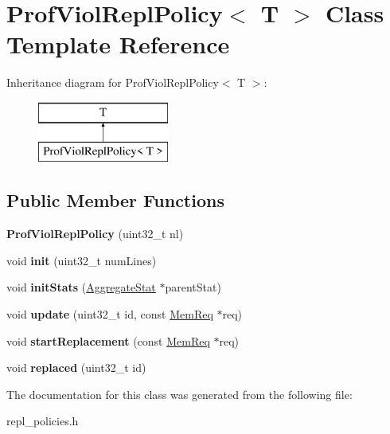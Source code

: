 \hypertarget{classProfViolReplPolicy}{\section{Prof\-Viol\-Repl\-Policy$<$ T $>$ Class Template Reference}
\label{classProfViolReplPolicy}
}
Inheritance diagram for Prof\-Viol\-Repl\-Policy$<$ T $>$\-:\begin{figure}[H]
\begin{center}
\leavevmode
\includegraphics[height=2.000000cm]{classProfViolReplPolicy}
\end{center}
\end{figure}
\subsection*{Public Member Functions}
\begin{DoxyCompactItemize}
\item 
\hypertarget{classProfViolReplPolicy_a2d18c0ce23ac41aec6f6072b346f633c}{{\bfseries Prof\-Viol\-Repl\-Policy} (uint32\-\_\-t nl)}\label{classProfViolReplPolicy_a2d18c0ce23ac41aec6f6072b346f633c}

\item 
\hypertarget{classProfViolReplPolicy_a2ab282d60729a80a3f385e47be4c256b}{void {\bfseries init} (uint32\-\_\-t num\-Lines)}\label{classProfViolReplPolicy_a2ab282d60729a80a3f385e47be4c256b}

\item 
\hypertarget{classProfViolReplPolicy_a386dca240e3305a99b077f9dc6949f04}{void {\bfseries init\-Stats} (\hyperlink{classAggregateStat}{Aggregate\-Stat} $\ast$parent\-Stat)}\label{classProfViolReplPolicy_a386dca240e3305a99b077f9dc6949f04}

\item 
\hypertarget{classProfViolReplPolicy_ab463dd1014ffe813a31216e3a55ba2a9}{void {\bfseries update} (uint32\-\_\-t id, const \hyperlink{structMemReq}{Mem\-Req} $\ast$req)}\label{classProfViolReplPolicy_ab463dd1014ffe813a31216e3a55ba2a9}

\item 
\hypertarget{classProfViolReplPolicy_a7c2e6d39c29c16e37571addbf39e3aaa}{void {\bfseries start\-Replacement} (const \hyperlink{structMemReq}{Mem\-Req} $\ast$req)}\label{classProfViolReplPolicy_a7c2e6d39c29c16e37571addbf39e3aaa}

\item 
\hypertarget{classProfViolReplPolicy_a0dc71739c20a5df5d621a41a07323247}{void {\bfseries replaced} (uint32\-\_\-t id)}\label{classProfViolReplPolicy_a0dc71739c20a5df5d621a41a07323247}

\end{DoxyCompactItemize}


The documentation for this class was generated from the following file\-:\begin{DoxyCompactItemize}
\item 
repl\-\_\-policies.\-h\end{DoxyCompactItemize}
